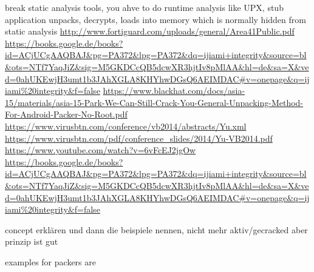 %

break static analysis tools, you ahve to do runtime analysis\newline
like UPX, stub application unpacks, decrypts, loads into memory which is normally hidden from static analysis\newline
\url{http://www.fortiguard.com/uploads/general/Area41Public.pdf}\newline
\url{https://books.google.de/books?id=ACjUCgAAQBAJ\&pg=PA372\&lpg=PA372\&dq=ijiami+integrity\&source=bl\&ots=NTf7YaqJiZ\&sig=M5GKDCcQB5dcwXR3hjtIv8pMlAA\&hl=de\&sa=X\&ved=0ahUKEwjH3umt1b3JAhXGLA8KHYhwDGsQ6AEIMDAC\#v=onepage\&q=ijiami%20integrity\&f=false}\newline
\url{https://www.blackhat.com/docs/asia-15/materials/asia-15-Park-We-Can-Still-Crack-You-General-Unpacking-Method-For-Android-Packer-No-Root.pdf}\newline
\url{https://www.virusbtn.com/conference/vb2014/abstracts/Yu.xml}\newline
\url{https://www.virusbtn.com/pdf/conference_slides/2014/Yu-VB2014.pdf}\newline
\url{https://www.youtube.com/watch?v=6vFcEJ2jgOw}\newline
\url{https://books.google.de/books?id=ACjUCgAAQBAJ&pg=PA372&lpg=PA372&dq=ijiami+integrity&source=bl&ots=NTf7YaqJiZ&sig=M5GKDCcQB5dcwXR3hjtIv8pMlAA&hl=de&sa=X&ved=0ahUKEwjH3umt1b3JAhXGLA8KHYhwDGsQ6AEIMDAC#v=onepage&q=ijiami%20integrity&f=false}\newline

concept erklären und dann die beispiele nennen, nicht mehr aktiv/gecracked aber prinzip ist gut\newline

examples for packers are
